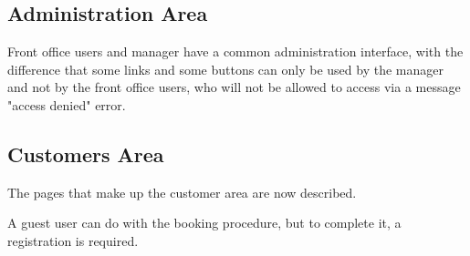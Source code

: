 \subsection{Administration Area}
Front office users and manager have a common administration interface, with the difference that some links and some buttons can only be used by the manager and not by the front office users, who will not be allowed to access via a message "access denied" error.



\subsection{Customers Area}
The pages that make up the customer area are now described. 
\par \noindent A guest user can do with the booking procedure, but to complete it, a registration is required. 


\pagebreak



